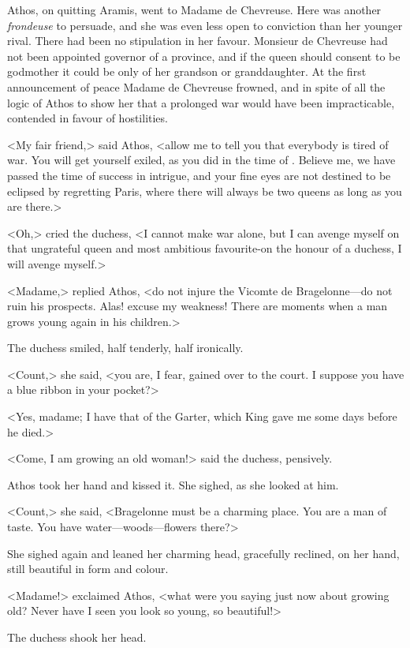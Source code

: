 Athos, on quitting Aramis, went to Madame de Chevreuse. Here was another \textit{frondeuse} to persuade, and she was even less open to conviction than her younger rival. There had been no stipulation in her favour. Monsieur de Chevreuse had not been appointed governor of a province, and if the queen should consent to be godmother it could be only of her grandson or granddaughter. At the first announcement of peace Madame de Chevreuse frowned, and in spite of all the logic of Athos to show her that a prolonged war would have been impracticable, contended in favour of hostilities.

<My fair friend,> said Athos, <allow me to tell you that everybody is tired of war. You will get yourself exiled, as you did in the time of . Believe me, we have passed the time of success in intrigue, and your fine eyes are not destined to be eclipsed by regretting Paris, where there will always be two queens as long as you are there.>

<Oh,> cried the duchess, <I cannot make war alone, but I can avenge myself on that ungrateful queen and most ambitious favourite-on the honour of a duchess, I will avenge myself.>

<Madame,> replied Athos, <do not injure the Vicomte de Bragelonne—do not ruin his prospects. Alas! excuse my weakness! There are moments when a man grows young again in his children.>

The duchess smiled, half tenderly, half ironically.

<Count,> she said, <you are, I fear, gained over to the court. I suppose you have a blue ribbon in your pocket?>

<Yes, madame; I have that of the Garter, which King   gave me some days before he died.>

<Come, I am growing an old woman!> said the duchess, pensively.

Athos took her hand and kissed it. She sighed, as she looked at him.

<Count,> she said, <Bragelonne must be a charming place. You are a man of taste. You have water—woods—flowers there?>

She sighed again and leaned her charming head, gracefully reclined, on her hand, still beautiful in form and colour.

<Madame!> exclaimed Athos, <what were you saying just now about growing old? Never have I seen you look so young, so beautiful!>

The duchess shook her head.

